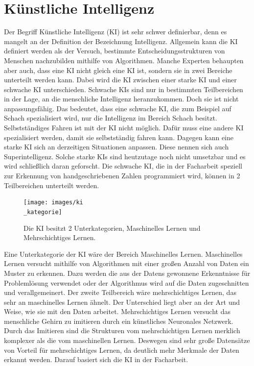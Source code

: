 \documentclass[11pt]{article}
\begin{document}
\section{Künstliche Intelligenz}
Der Begriff Künstliche Intelligenz (KI) ist sehr schwer definierbar, denn es mangelt an der Definition der Bezeichnung Intelligenz.
Allgemein kann die KI definiert werden als der Versuch, bestimmte Entscheidungsstrukturen von Menschen nachzubilden mithilfe von
Algorithmen. Manche Experten behaupten aber auch, dass eine KI nicht gleich eine KI ist, sondern sie in zwei Bereiche unterteilt werden kann.
Dabei wird die KI zwischen einer starke KI und einer schwache KI unterschieden. Schwache KIs sind nur in bestimmten Teilbereichen in der Lage,
an die menschliche Intelligenz heranzukommen. Doch sie ist nicht anpassungsfähig. Das bedeutet, dass eine schwache KI, die zum Beispiel auf Schach
spezialisiert wird, nur die Intelligenz im Bereich Schach besitzt. Selbstständiges Fahren ist mit der KI nicht möglich. Dafür muss eine
andere KI spezialisiert werden, damit sie selbstständig fahren kann. Dagegen kann eine starke KI sich an derzeitigen Situationen anpassen. Diese nennen sich auch Superintelligenz.
Solche starke KIs sind heutzutage noch nicht umsetzbar und es wird schließlich daran geforscht.
Die schwache KI, die in der Facharbeit speziell zur Erkennung von handgeschriebenen Zahlen programmiert wird, können in 2 Teilbereichen
unterteilt werden.
\begin{figure}[h]
    \centering
    \texttt{[image: images/ki\\\_kategorie]}
    \caption[Unterkategorien der Künstliche Intelligenz]{Die KI besitzt 2 Unterkategorien, Maschinelles Lernen und Mehrschichtiges Lernen.}
\end{figure}
Eine Unterkategorie der KI wäre der Bereich Maschinelles Lernen. Maschinelles Lernen versucht mithilfe von Algorithmen mit einer großen Anzahl von
Daten ein Muster zu erkennen. Dazu werden die aus der Datens gewonnene Erkenntnisse für Problemlösung verwendet oder der Algorithmus wird auf
die Daten zugeschnitten und verallgemeinert.
Der zweite Teilbereich wäre mehrschichtiges Lernen, das sehr an maschinelles Lernen ähnelt. Der Unterschied liegt aber an der Art und Weise, wie
sie mit den Daten arbeitet. Mehrschichtiges Lernen versucht das menschliche Gehirn zu imitieren durch ein künstliches Neuronales Netzwerk.
Durch das Imitieren sind die Strukturen vom mehrschichtigen Lernen merklich komplexer als die vom maschinellen Lernen. Deswegen sind
sehr große Datensätze von Vorteil für mehrschichtiges Lernen, da deutlich mehr Merkmale der Daten erkannt werden. Darauf basiert sich die KI
in der Facharbeit.
\end{document}
